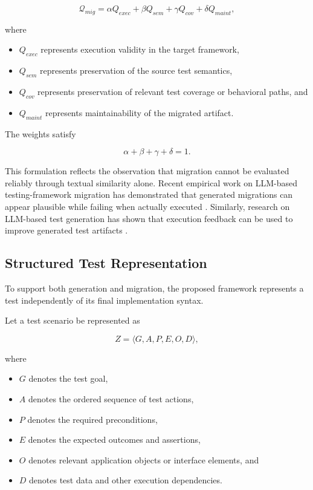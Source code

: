 \documentclass[pdflatex,sn-mathphys-num]{sn-jnl}
\begin{document}
\begin{equation}
    \mathcal{Q}_{mig}
    =
    \alpha Q_{exec}
    +
    \beta Q_{sem}
    +
    \gamma Q_{cov}
    +
    \delta Q_{maint},
\label{eq:migration-quality}
\end{equation}

where

\begin{itemize}
    \item $Q_{exec}$ represents execution validity in the target framework,
    \item $Q_{sem}$ represents preservation of the source test semantics,
    \item $Q_{cov}$ represents preservation of relevant test coverage or
    behavioral paths, and
    \item $Q_{maint}$ represents maintainability of the migrated artifact.
\end{itemize}

The weights satisfy

\begin{equation}
    \alpha+\beta+\gamma+\delta=1.
\end{equation}

This formulation reflects the observation that migration cannot be
evaluated reliably through textual similarity alone. Recent empirical work
on LLM-based testing-framework migration has demonstrated that generated
migrations can appear plausible while failing when actually executed
\cite{alves2026migration}. Similarly, research on LLM-based test generation
has shown that execution feedback can be used to improve generated test
artifacts \cite{schafer2024testpilot,yuan2024chatgpt}.

\subsection{Structured Test Representation}

To support both generation and migration, the proposed framework represents
a test independently of its final implementation syntax.

Let a test scenario be represented as

\begin{equation}
    Z =
    \langle
    G,A,P,E,O,D
    \rangle ,
\label{eq:test-representation}
\end{equation}

where

\begin{itemize}
    \item $G$ denotes the test goal,
    \item $A$ denotes the ordered sequence of test actions,
    \item $P$ denotes the required preconditions,
    \item $E$ denotes the expected outcomes and assertions,
    \item $O$ denotes relevant application objects or interface elements, and
    \item $D$ denotes test data and other execution dependencies.
\end{itemize}
\end{document}
